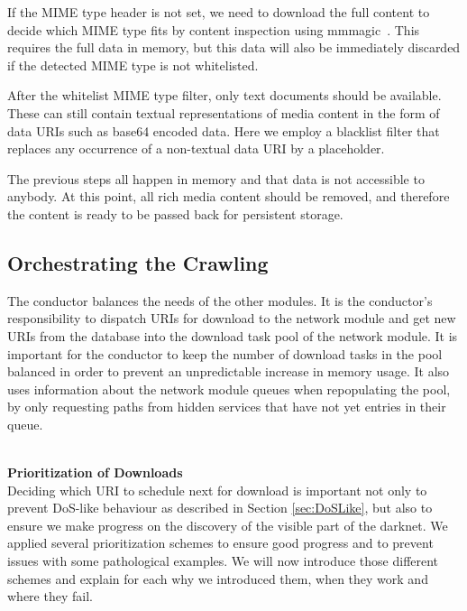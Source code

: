 \documentclass[USenglish,oneside,twocolumn]{article}
\newcommand{\sh}[1]{\noindent\vspace{0.5\baselineskip}\\ \textbf{#1}\\}
\begin{document}
If the MIME type header is not set, we need to download the full content to decide which MIME type fits by content inspection using mmmagic~\cite{mscdex}. This requires the full data in memory, but this data will also be immediately discarded if the detected MIME type is not whitelisted.

After the whitelist MIME type filter, only text documents should be available. These can still contain textual representations of media content in the form of data URIs such as base64 encoded data. Here we employ a blacklist filter that replaces any occurrence of a non-textual data URI by a placeholder. 

The previous steps all happen in memory and that data is not accessible to anybody. At this point, all rich media content should be removed, and therefore the content is ready to be passed back for persistent storage. 
%
%
\subsection{Orchestrating the Crawling}
The conductor balances the needs of the other modules. It is the conductor's responsibility to dispatch URIs for download to the network module and get new URIs from the database into the download task pool of the network module. It is important for the conductor to keep the number of download tasks in the pool balanced in order to prevent an unpredictable increase in memory usage. It also uses information about the network module queues when repopulating the pool, by only requesting paths from hidden services that have not yet entries in their queue.

\sh{Prioritization of Downloads}
\label{sec:prioritizationDownload}
Deciding which URI to schedule next for download is important not only to prevent DoS-like behaviour as described in Section \ref{sec:DoSLike}, but also to ensure we make progress on the discovery of the visible part of the darknet. We applied several prioritization schemes to ensure good progress and to prevent issues with some pathological examples. We will now introduce those different schemes and explain for each why we introduced them, when they work and where they fail. 
\end{document}
